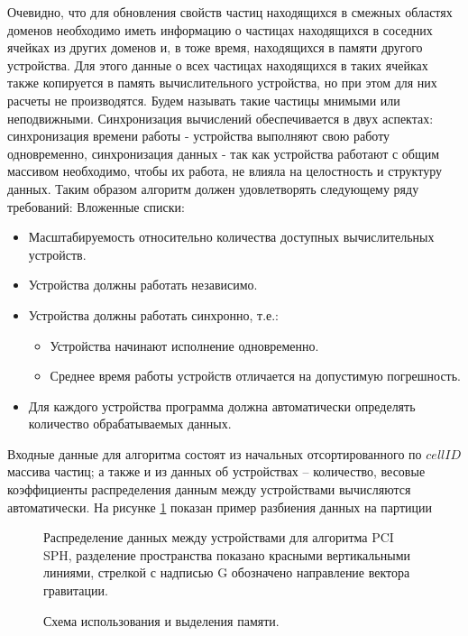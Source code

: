 Очевидно, что для обновления свойств частиц находящихся в смежных областях доменов необходимо иметь информацию о частицах находящихся в соседних ячейках из других доменов и, в тоже время, находящихся в памяти другого устройства. Для этого данные о всех частицах находящихся в таких ячейках также копируется в память вычислительного устройства, но при этом для них расчеты не производятся. Будем называть такие частицы мнимыми или неподвижными.
Синхронизация вычислений обеспечивается в двух аспектах: синхронизация времени работы - устройства выполняют свою работу одновременно, синхронизация данных - так как устройства работают с общим массивом необходимо, чтобы их работа, не влияла на целостность и структуру данных. Таким образом алгоритм должен удовлетворять следующему ряду требований:
\noindent Вложенные списки:
\begin{itemize}
  \item Масштабируемость относительно количества доступных вычислительных устройств.
  \item Устройства должны работать независимо.
  \item Устройства должны работать синхронно, т.е.:
        \begin{itemize}
          \item Устройства начинают исполнение  одновременно.
          \item Среднее время работы устройств отличается на допустимую погрешность.
        \end{itemize}
  \item Для каждого устройства программа должна автоматически определять количество обрабатываемых данных.
\end{itemize}

Входные данные для алгоритма состоят из начальных отсортированного по  \(cellID\) массива частиц; а также и из данных об устройствах – количество, весовые коэффициенты распределения данным между устройствами вычисляются автоматически. На рисунке \ref{fig:dstr_2} показан пример разбиения данных на партиции
\begin{figure}[ht]
  \caption{Распределение данных между устройствами для алгоритма PCI SPH, разделение пространства показано красными вертикальными линиями, стрелкой с надписью G обозначено направление вектора гравитации.}
  \label{fig:dstr_2}
\end{figure}

\begin{figure}[ht]
  \caption{Схема использования и выделения памяти.}
  \label{fig:dstr_3}
\end{figure}

